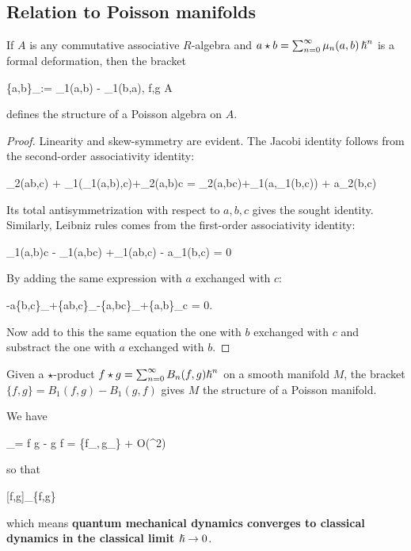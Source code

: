 \subsection{Relation to Poisson manifolds}
\begin{proposition}
	If $A$ is any commutative associative $R$-algebra and $a \star b = \sum_{n=0}^\infty \mu_n(a,b)\,{\boldsymbol\hslash}^n$ is a formal deformation, then the bracket
	\begin{eqalign}
		\{a,b\}_\star := \mu_1(a,b) - \mu_1(b,a), \quad \forall f,g \in A
	\end{eqalign}
	defines the structure of a Poisson algebra on $A$.
\end{proposition}
\begin{proof}
	Linearity and skew-symmetry are evident. The Jacobi identity follows from the second-order associativity identity:
	\begin{eqalign}
		\mu_2(ab,c) + \mu_1(\mu_1(a,b),c)+\mu_2(a,b)c = \mu_2(a,bc)+\mu_1(a,\mu_1(b,c)) + a\mu_2(b,c)
	\end{eqalign}
	Its total antisymmetrization with respect to $a,b,c$ gives the sought identity. Similarly, Leibniz rules comes from the first-order associativity identity:
	\begin{eqalign}
		\mu_1(a,b)c - \mu_1(a,bc) +\mu_1(ab,c) - a\mu_1(b,c) = 0
	\end{eqalign}
	By adding the same expression with $a$ exchanged with $c$:
	\begin{eqalign}
		-a\{b,c\}_\star +\{ab,c\}_\star -\{a,bc\}_\star +\{a,b\}_\star c = 0.
	\end{eqalign}
	Now add to this the same equation the one with $b$ exchanged with $c$ and substract the one with $a$ exchanged with $b$.
\end{proof}
\begin{corollary}
	Given a $\star$-product $f \star g = \sum_{n=0}^\infty B_n(f,g){\boldsymbol\hslash}^n$ on a smooth manifold $M$, the bracket $\{f,g\} = B_1(f,g) - B_1(g,f)$ gives $M$ the structure of a Poisson manifold.
\end{corollary}

\begin{remark}
	We have
	\begin{eqalign}
		[f,g]_\star = f \star g - g \star f = \planck \{f\vert_{},\,g\vert_{}\} + O(\planck^2)
	\end{eqalign}
	so that
	\begin{eqalign}
		[f,g]_\star \conv[\planck \to 0] \{f,g\}
	\end{eqalign}
	which means \textbf{quantum mechanical dynamics converges to classical dynamics in the classical limit ${\boldsymbol\hslash} \to 0$}.
\end{remark}

